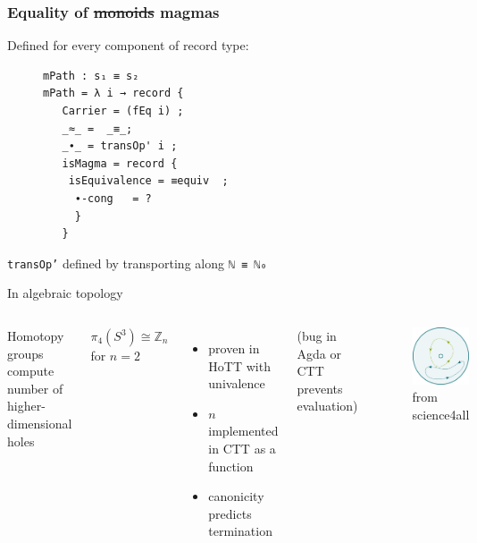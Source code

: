 \documentclass[english,draft]{beamer}
\begin{document}
\begin{frame}[fragile]
\frametitle{Equality of \st{monoids} magmas}

Defined for every component of record type:

\begin{figure}
\begin{BVerbatim}
mPath : s₁ ≡ s₂
mPath = λ i → record {
   Carrier = (fEq i) ;
   _≈_ =  _≡_;
   _∙_ = transOp' i ;
   isMagma = record {
    isEquivalence = ≡equiv  ;
     ∙-cong   = ?
     }
   }
\end{BVerbatim}
\end{figure}

\texttt{transOp'} defined by transporting along \texttt{ℕ ≡ ℕ₀}

\end{frame}

\begin{frame}{In algebraic topology}

 \begin{columns}%
        Homotopy groups compute number of higher-dimensional holes
        \begin{theorem}
            $\pi _ 4 (S^3) \cong \mathbb{Z}_n$ for $n=2$ 

            \end{theorem}
            \begin{itemize}
            \item proven in HoTT with univalence
            \item $n$ implemented in CTT as a function
            \item canonicity predicts termination
            \end{itemize}
        (bug in Agda or CTT prevents evaluation)

            \begin{figure}
                \includegraphics[height=0.4\textheight]{figures/loops}
                \caption{from science4all}
            \end{figure}
    \end{columns}

\end{frame}
\end{document}
